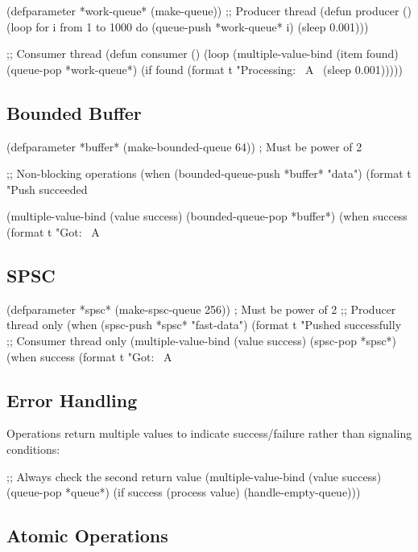 \documentclass[12pt, letterpaper]{article}
\begin{document}
\begin{lispcode}
(defparameter *work-queue* (make-queue))
;; Producer thread
(defun producer ()
(loop for i from 1 to 1000 do
(queue-push *work-queue* i)
(sleep 0.001)))

;; Consumer thread
(defun consumer ()
(loop
(multiple-value-bind (item found)
(queue-pop *work-queue*)
(if found
(format t "Processing: ~A~%
(sleep 0.001)))))
\end{lispcode}
	
	\subsection{Bounded Buffer}
\begin{lispcode}
(defparameter *buffer* (make-bounded-queue 64))  ; Must be power of 2

;; Non-blocking operations
(when (bounded-queue-push *buffer* "data")
(format t "Push succeeded~%

(multiple-value-bind (value success)
(bounded-queue-pop *buffer*)
(when success
(format t "Got: ~A~%
\end{lispcode}
	
	\subsection{SPSC}
\begin{lispcode}
(defparameter *spsc* (make-spsc-queue 256))  ; Must be power of 2
;; Producer thread only
(when (spsc-push *spsc* "fast-data")
(format t "Pushed successfully~%
;; Consumer thread only  
(multiple-value-bind (value success)
(spsc-pop *spsc*)
(when success
(format t "Got: ~A~%
\end{lispcode}
	
	\subsection{Error Handling}
	Operations return multiple values to indicate success/failure rather than signaling conditions:
\begin{lispcode}
;; Always check the second return value
(multiple-value-bind (value success)
(queue-pop *queue*)
(if success
(process value)
(handle-empty-queue)))
\end{lispcode}
	
	\subsection{Atomic Operations}
\end{document}
